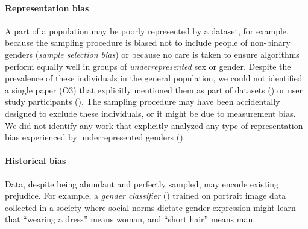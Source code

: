 \documentclass[nonacm,sigconf,review,balance=false]{acmart}
\begin{document}
\paragraph*{Representation bias} A part of a population may be poorly represented by a dataset, for example, because the sampling procedure is biased not to include people of non-binary genders (\emph{sample selection bias}) or because no care is taken to ensure algorithms perform equally well in  groups of \emph{underrepresented} sex or gender. Despite the prevalence of these individuals in the general population, we could not identified a single paper (O3) that explicitly mentioned them as part of datasets (\dataset) or user study participants (\userstudy). The sampling procedure may have been accidentally designed to exclude these individuals, or it might be due to measurement bias. We did not identify any work that explicitly analyzed any type of representation bias experienced by underrepresented genders (\binary). 

\paragraph*{Historical bias} Data, despite being abundant and perfectly sampled, may encode existing prejudice. For example, a \emph{gender classifier} (\classifier) trained on portrait image data collected in a society where social norms dictate gender expression might learn that ``wearing a dress'' means woman, and ``short hair'' means man. 
\end{document}
